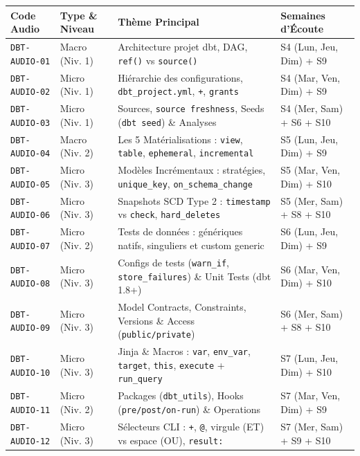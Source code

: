 \documentclass[11pt,a4paper]{article}
\begin{document}
\begin{table}[h!]
\centering
\footnotesize
\begin{tabularx}{\textwidth}{l l X l}
\toprule
\textbf{Code Audio} & \textbf{Type \& Niveau} & \textbf{Thème Principal} & \textbf{Semaines d'Écoute} \\
\midrule
\texttt{DBT-AUDIO-01} & Macro (Niv. 1) & Architecture projet dbt, DAG, \texttt{ref()} vs \texttt{source()} & S4 (Lun, Jeu, Dim) + S9 \\
\texttt{DBT-AUDIO-02} & Micro (Niv. 1) & Hiérarchie des configurations, \texttt{dbt\_project.yml}, \texttt{+}, \texttt{grants} & S4 (Mar, Ven, Dim) + S9 \\
\texttt{DBT-AUDIO-03} & Micro (Niv. 1) & Sources, \texttt{source freshness}, Seeds (\texttt{dbt seed}) \& Analyses & S4 (Mer, Sam) + S6 + S10 \\
\texttt{DBT-AUDIO-04} & Macro (Niv. 2) & Les 5 Matérialisations : \texttt{view}, \texttt{table}, \texttt{ephemeral}, \texttt{incremental} & S5 (Lun, Jeu, Dim) + S9 \\
\texttt{DBT-AUDIO-05} & Micro (Niv. 3) & Modèles Incrémentaux : stratégies, \texttt{unique\_key}, \texttt{on\_schema\_change} & S5 (Mar, Ven, Dim) + S10 \\
\texttt{DBT-AUDIO-06} & Micro (Niv. 3) & Snapshots SCD Type 2 : \texttt{timestamp} vs \texttt{check}, \texttt{hard\_deletes} & S5 (Mer, Sam) + S8 + S10 \\
\texttt{DBT-AUDIO-07} & Micro (Niv. 2) & Tests de données : génériques natifs, singuliers et custom generic & S6 (Lun, Jeu, Dim) + S9 \\
\texttt{DBT-AUDIO-08} & Micro (Niv. 3) & Configs de tests (\texttt{warn\_if}, \texttt{store\_failures}) \& Unit Tests (dbt 1.8+) & S6 (Mar, Ven, Dim) + S10 \\
\texttt{DBT-AUDIO-09} & Micro (Niv. 3) & Model Contracts, Constraints, Versions \& Access (\texttt{public/private}) & S6 (Mer, Sam) + S8 + S10 \\
\texttt{DBT-AUDIO-10} & Micro (Niv. 3) & Jinja \& Macros : \texttt{var}, \texttt{env\_var}, \texttt{target}, \texttt{this}, \texttt{execute} + \texttt{run\_query} & S7 (Lun, Jeu, Dim) + S10 \\
\texttt{DBT-AUDIO-11} & Micro (Niv. 2) & Packages (\texttt{dbt\_utils}), Hooks (\texttt{pre/post/on-run}) \& Operations & S7 (Mar, Ven, Dim) + S9 \\
\texttt{DBT-AUDIO-12} & Micro (Niv. 3) & Sélecteurs CLI : \texttt{+}, \texttt{@}, virgule (ET) vs espace (OU), \texttt{result:} & S7 (Mer, Sam) + S9 + S10 \\

\end{tabularx}
\end{table}
\end{document}
